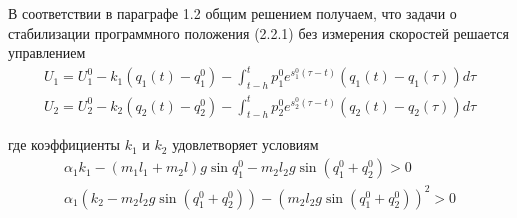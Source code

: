 В соответствии в параграфе 1.2 общим решением получаем, что задачи о стабилизации программного положения (2.2.1) без измерения скоростей решается управлением 
$$
\begin{array}{l}
\displaystyle U_1 = U_1^0 - k_1 (q_1(t) - q_1^0) - \int_{t-h}^{t} p_1^0 e^{s_1^0 (\tau - t)} (q_1(t) - q_1(\tau)) d \tau\\
\displaystyle U_2 = U_2^0 - k_2 (q_2(t) - q_2^0) - \int_{t-h}^{t} p_2^0 e^{s_2^0 (\tau - t)} (q_2(t) - q_2(\tau)) d \tau
\end{array}
$$

где коэффициенты $k_1$ и $k_2$ удовлетворяет условиям 
$$
\begin{array}{c}
\alpha_1 k_1 - (m_1 l_1 + m_2 l) g \sin q_1^0 - m_2 l_2 g \sin (q_1^0 + q_2^0) > 0\\
\alpha_1 (k_2 - m_2 l_2 g \sin (q_1^0 + q_2^0)) - (m_2 l_2 g \sin (q_1^0 + q_2^0))^2 > 0
\end{array}
$$